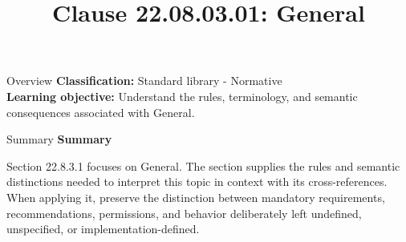 \documentclass[10pt,letterpaper]{article}
\title{Clause 22.08.03.01: General}
\author{}
\date{}
\begin{document}
\maketitle
\begin{CornellOverviewBox}{Overview}
\textbf{Classification:} Standard library - Normative\\[2pt]
\textbf{Learning objective:} Understand the rules, terminology, and semantic consequences associated with General.
\end{CornellOverviewBox}\begin{CornellSummaryBox}{Summary}
{\sffamily\bfseries\color{Accent} Summary}\par\vspace{3pt}Section 22.8.3.1 focuses on General. The section supplies the rules and semantic distinctions needed to interpret this topic in context with its cross-references. When applying it, preserve the distinction between mandatory requirements, recommendations, permissions, and behavior deliberately left undefined, unspecified, or implementation-defined.
\end{CornellSummaryBox}
\end{document}
